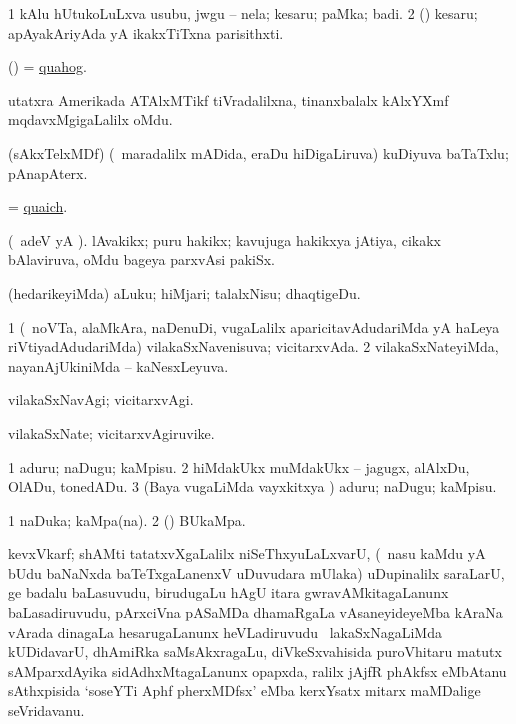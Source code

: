\bentry
{}
\gl{\nA}
\bmng
\bnum
\num{1} kAlu hUtukoLuLxva usubu, jwgu -- nela; kesaru; paMka; badi. 
\num{2} (\rUpa) kesaru; apAyakAriyAda yA ikakxTiTxna parisithxti. 
\enum
\emng
\eentry

\bentry
{}
\gl{\nA}
\bmng
(\ame) = \hyperlink{quahog}{quahog}. 
\emng
\eentry

\bentry
{}
\gl{\nA}
\bmng
utatxra Amerikada ATAlxMTikf tiVradalilxna, tinanxbalalx kAlx$\!$YXmf mqdavxMgigaLalilx oMdu. 
\emng
\eentry

\bentry
{}
\gl{\nA}
\bmng
(sAkxTelxMDf) (\sA\ maradalilx mADida, eraDu hiDigaLiruva) kuDiyuva baTaTxlu; pAnapAterx. 
\emng
\eentry

\bentry
{}
\gl{\nA}
\bmng
= \hyperlink{quaich}{quaich}. 
\emng
\eentry

\bentry
{}
\gl{\nA}
\bmng
(\bava\ adeV yA ). lAvakikx; puru hakikx; kavujuga hakikxya jAtiya, cikakx bAlaviruva, oMdu bageya parxvAsi pakiSx. 
\emng
\eentry

\bentry
{}
\gl{\akirx}
\bmng
(hedarikeyiMda) aLuku; hiMjari; talalxNisu; dhaqtigeDu. 
\emng
\eentry

\bentry
{}
\gl{\gu}
\bmng
\bnum
\num{1} (\kanmu\ noVTa, alaMkAra, naDenuDi, \mo vugaLalilx aparicitavAdudariMda yA haLeya riVtiyadAdudariMda) vilakaSxNavenisuva; vicitarxvAda. 
\num{2} vilakaSxNateyiMda, nayanAjUkiniMda -- kaNesxLeyuva. 
\enum
\emng
\eentry

\bentry
{}
\gl{\kirxvi}
\bmng
vilakaSxNavAgi; vicitarxvAgi. 
\emng
\eentry

\bentry
{}
\gl{\nA}
\bmng
vilakaSxNate; vicitarxvAgiruvike. 
\emng
\eentry

\bentry
{}
\gl{\akirx}
\bmng
\bnum
\num{1} aduru; naDugu; kaMpisu. 
\num{2} hiMdakUkx muMdakUkx -- jagugx, alAlxDu, OlADu, tonedADu. 
\num{3} (Baya \mo vugaLiMda vayxkitxya \vi) aduru; naDugu; kaMpisu. 
\enum
\emng
\eentry

\bentry
{}
\gl{\nA}
\bmng
\bnum
\num{1} naDuka; kaMpa(na). 
\num{2} (\AmA) BUkaMpa. 
\enum
\emng
\eentry

\bentry
{}
\gl{\nA}
\bmng
kevxVkarf; shAMti tatatxvXgaLalilx niSeThxyuLaLxvarU, (\kanmu\ nasu kaMdu yA bUdu baNaNxda baTeTxgaLanenxV uDuvudara mUlaka) uDupinalilx saraLarU, ge badalu  baLasuvudu, birudugaLu hAgU itara gwravAMkitagaLanunx baLasadiruvudu, pArxciVna pASaMDa dhamaRgaLa vAsaneyideyeMba kAraNa vArada dinagaLa hesarugaLanunx heVLadiruvudu \mo\ lakaSxNagaLiMda kUDidavarU, dhAmiRka saMsAkxragaLu, diVkeSxvahisida puroVhitaru matutx sAMparxdAyika sidAdhxMtagaLanunx opapxda, ralilx jAjfR phAkfsx eMbAtanu sAthxpisida `soseYTi Aphf pherxMDfsx' eMba kerxYsatx mitarx maMDalige seVridavanu. 
\emng
\eentry

